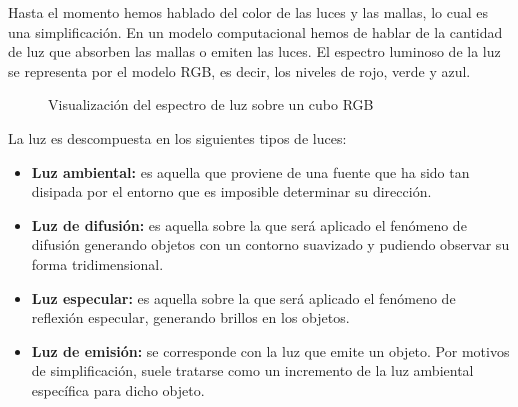 Hasta el momento hemos hablado del color de las luces y las mallas, lo cual es una simplificación. En un modelo computacional hemos de hablar de la cantidad de luz que absorben las mallas o emiten las luces. El espectro luminoso de la luz se representa por el modelo RGB, es decir, los niveles de rojo, verde y azul. 
\begin{figure}[h!]
	\centering	  
	\caption{Visualización del espectro de luz sobre un cubo RGB}
\end{figure}

La luz es descompuesta en los siguientes tipos de luces:
\begin{itemize}
\item \textbf{Luz ambiental:} es aquella que proviene de una fuente que ha sido tan disipada por el entorno que es imposible determinar su dirección.
\item \textbf{Luz de difusión:} es aquella sobre la que será aplicado el fenómeno de difusión generando objetos con un contorno suavizado y pudiendo observar su forma tridimensional.
\item \textbf{Luz especular:} es aquella sobre la que será aplicado el fenómeno de reflexión especular, generando brillos en los objetos.
\item \textbf{Luz de emisión:} se corresponde con la luz que emite un objeto. Por motivos de simplificación, suele tratarse como un incremento de la luz ambiental específica para dicho objeto.
\end{itemize}

